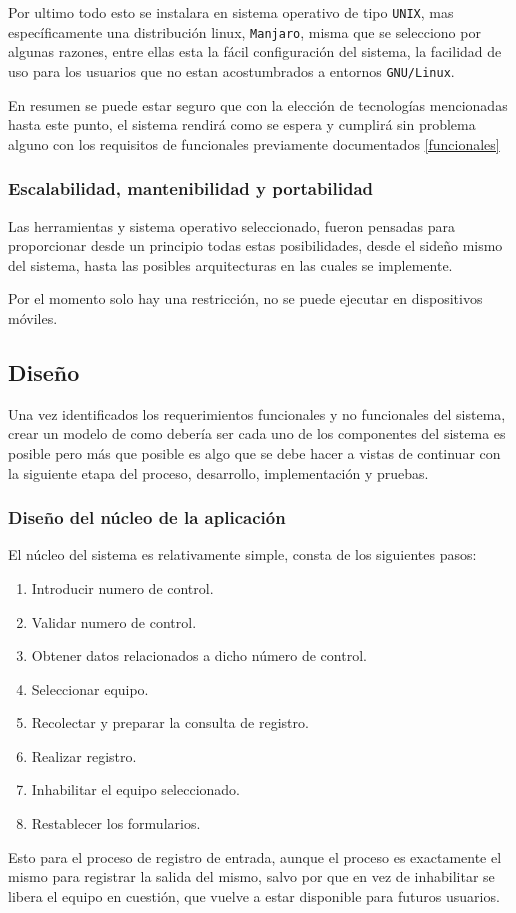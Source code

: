 \documentclass[12pt]{article} %
\begin{document}
			Por ultimo todo esto se instalara en sistema operativo de tipo \texttt{UNIX}, mas específicamente una distribución linux, \texttt{Manjaro}, misma que se selecciono
			por algunas razones, entre ellas esta la fácil configuración del sistema, la facilidad de uso para los usuarios que no estan acostumbrados a entornos 
			\texttt{GNU/Linux}.
			
			En resumen se puede estar seguro que con la elección de tecnologías mencionadas hasta este punto, el sistema rendirá como se espera y cumplirá sin problema alguno 
			con los requisitos de funcionales previamente documentados \ref{funcionales}
		
		\subsubsection{Escalabilidad, mantenibilidad y portabilidad}
			Las herramientas y sistema operativo seleccionado, fueron pensadas para proporcionar desde un principio todas estas posibilidades, desde el side\~no mismo del
			sistema, hasta las posibles arquitecturas en las cuales se implemente.
			
			Por el momento solo hay una restricción, no se puede ejecutar en dispositivos móviles.
			
  \subsection{Dise\~no \label{dise}}
  		Una vez identificados los requerimientos funcionales y no funcionales del sistema, crear un modelo de como debería ser cada uno de los componentes del sistema es posible
  		pero m\'as que posible es algo que se debe hacer a vistas de continuar con la siguiente etapa del proceso, desarrollo, implementaci\'on y pruebas.
  	
	  	\subsubsection{Dise\~no del núcleo de la aplicación}
			El n\'ucleo del sistema es relativamente simple, consta de los siguientes pasos:
			\begin{enumerate}
				\item Introducir numero de control.
				\item Validar numero de control.
				\item Obtener datos relacionados a dicho n\'umero de control.
				\item Seleccionar equipo.
				\item Recolectar y preparar la consulta de registro.
				\item Realizar registro.
				\item Inhabilitar el equipo seleccionado.
				\item Restablecer los formularios.
			\end{enumerate}
			Esto para el proceso de registro de entrada, aunque el proceso es exactamente el mismo para registrar la salida del mismo, salvo por que en vez de inhabilitar se 
			libera el equipo en cuestión, que vuelve a estar disponible para futuros usuarios.
			
\end{document}
